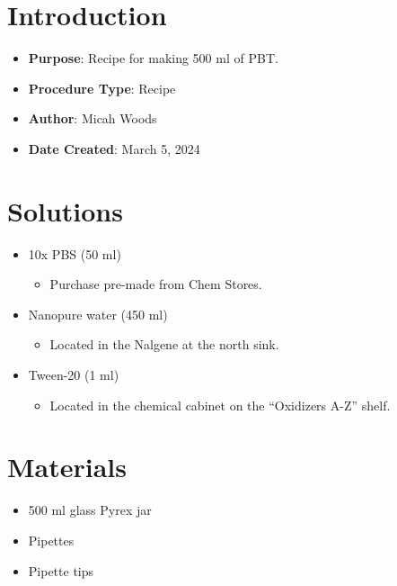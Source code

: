 \documentclass[
  letterpaper,
  DIV=11,
  numbers=noendperiod]{scrreprt}
\providecommand{\tightlist}{%
  \setlength{\itemsep}{0pt}\setlength{\parskip}{0pt}}\usepackage{longtable,booktabs,array}
\begin{document}
\hypertarget{introduction-102}{%
\section{Introduction}\label{introduction-102}}

\begin{itemize}
\tightlist
\item
  \textbf{Purpose}: Recipe for making 500 ml of PBT.
\item
  \textbf{Procedure Type}: Recipe
\item
  \textbf{Author}: Micah Woods
\item
  \textbf{Date Created}: March 5, 2024
\end{itemize}

\hypertarget{solutions-88}{%
\section{Solutions}\label{solutions-88}}

\begin{itemize}
\tightlist
\item
  10x PBS (50 ml)

  \begin{itemize}
  \tightlist
  \item
    Purchase pre-made from Chem Stores.
  \end{itemize}
\item
  Nanopure water (450 ml)

  \begin{itemize}
  \tightlist
  \item
    Located in the Nalgene at the north sink.
  \end{itemize}
\item
  Tween-20 (1 ml)

  \begin{itemize}
  \tightlist
  \item
    Located in the chemical cabinet on the ``Oxidizers A-Z'' shelf.
  \end{itemize}
\end{itemize}

\hypertarget{materials-97}{%
\section{Materials}\label{materials-97}}

\begin{itemize}
\tightlist
\item
  500 ml glass Pyrex jar
\item
  Pipettes
\item
  Pipette tips
\end{itemize}
\end{document}
